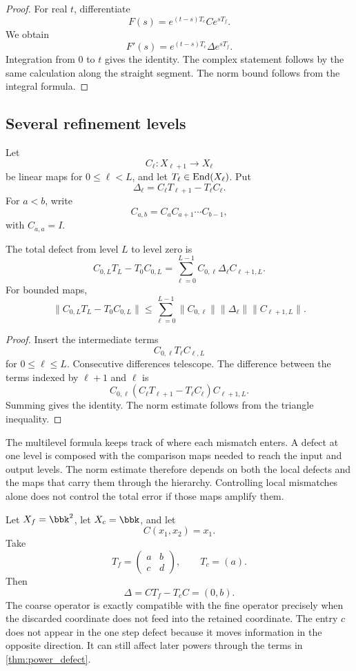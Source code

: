 \begin{proof}
For real $t$, differentiate
\[
F(s)=e^{(t-s)T_c}Ce^{sT_f}.
\]
We obtain
\[
F'(s)=e^{(t-s)T_c}\Delta e^{sT_f}.
\]
Integration from $0$ to $t$ gives the identity.  The complex statement follows by the same calculation along the straight segment.  The norm bound follows from the integral formula.
\end{proof}

\subsection{Several refinement levels}

Let
\[
C_\ell:X_{\ell+1}\longrightarrow X_\ell
\]
be linear maps for $0\leq\ell<L$, and let $T_\ell\in\operatorname{End}(X_\ell)$.  Put
\[
\Delta_\ell=C_\ell T_{\ell+1}-T_\ell C_\ell.
\]
For $a<b$, write
\[
C_{a,b}=C_aC_{a+1}\cdots C_{b-1},
\]
with $C_{a,a}=I$.

\begin{theorem}\label{thm:multilevel_defect}
The total defect from level $L$ to level zero is
\[
C_{0,L}T_L-T_0C_{0,L}
=
\sum_{\ell=0}^{L-1}
C_{0,\ell}\Delta_\ell C_{\ell+1,L}.
\]
For bounded maps,
\[
\|C_{0,L}T_L-T_0C_{0,L}\|
\leq
\sum_{\ell=0}^{L-1}
\|C_{0,\ell}\|
\|\Delta_\ell\|
\|C_{\ell+1,L}\|.
\]
\end{theorem}

\begin{proof}
Insert the intermediate terms
\[
C_{0,\ell}T_\ell C_{\ell,L}
\]
for $0\leq\ell\leq L$.  Consecutive differences telescope.  The difference between the terms indexed by $\ell+1$ and $\ell$ is
\[
C_{0,\ell}(C_\ell T_{\ell+1}-T_\ell C_\ell)C_{\ell+1,L}.
\]
Summing gives the identity.  The norm estimate follows from the triangle inequality.
\end{proof}

\begin{interpretation}
The multilevel formula keeps track of where each mismatch enters. A defect at one level is composed with the comparison maps needed to reach the input and output levels. The norm estimate therefore depends on both the local defects and the maps that carry them through the hierarchy. Controlling local mismatches alone does not control the total error if those maps amplify them.
\end{interpretation}

\begin{example}\label{ex:defect_example}
Let $X_f=\bbk^2$, let $X_c=\bbk$, and let
\[
C(x_1,x_2)=x_1.
\]
Take
\[
T_f=
\begin{pmatrix}
a&b\\
c&d
\end{pmatrix},
\qquad
T_c=(a).
\]
Then
\[
\Delta=CT_f-T_cC=(0,b).
\]
The coarse operator is exactly compatible with the fine operator precisely when the discarded coordinate does not feed into the retained coordinate.  The entry $c$ does not appear in the one step defect because it moves information in the opposite direction.  It can still affect later powers through the terms in \cref{thm:power_defect}.
\end{example}

